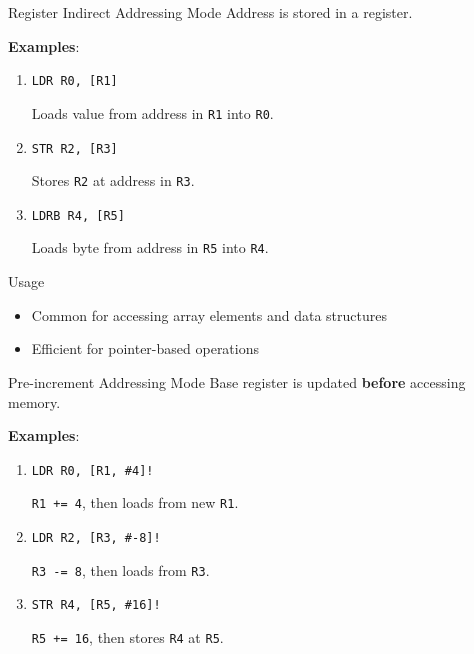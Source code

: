 \documentclass[aspectratio=169]{beamer}
\begin{document}
\begin{frame}{Register Indirect Addressing Mode}
    Address is stored in a register.
    
    \textbf{Examples}:
    \begin{enumerate}
        \item \texttt{LDR R0, [R1]}  
        
        Loads value from address in \texttt{R1} into \texttt{R0}.
        
        \item \texttt{STR R2, [R3]}  
        
        Stores \texttt{R2} at address in \texttt{R3}.
        
        \item \texttt{LDRB R4, [R5]}  
        
        Loads byte from address in \texttt{R5} into \texttt{R4}.
    \end{enumerate}

    \begin{block}{Usage}
        \begin{itemize}
        \item Common for accessing array elements and data structures
        \item Efficient for pointer-based operations
        \end{itemize}
    \end{block}

\end{frame}

\begin{frame}{Pre-increment Addressing Mode}
    Base register is updated \textbf{before} accessing memory.
    
    \textbf{Examples}:
    \begin{enumerate}
        \item \texttt{LDR R0, [R1, \#4]!}  
        
        \texttt{R1 += 4}, then loads from new \texttt{R1}.
        
        \item \texttt{LDR R2, [R3, \#-8]!}  
        
        \texttt{R3 -= 8}, then loads from \texttt{R3}.
        
        \item \texttt{STR R4, [R5, \#16]!}  
        
        \texttt{R5 += 16}, then stores \texttt{R4} at \texttt{R5}.
    \end{enumerate}
\end{frame}
\end{document}
